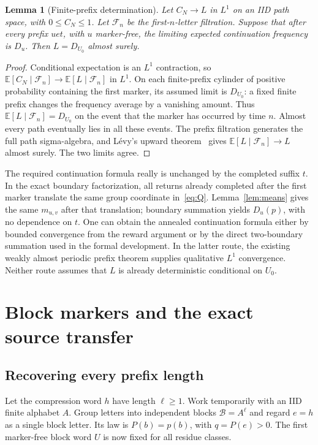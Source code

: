 \documentclass[11pt]{article}
\newtheorem{lemma}[theorem]{Lemma}
\theoremstyle{definition}
\theoremstyle{remark}
\newcommand{\E}{\mathbb E}
\newcommand{\F}{\mathcal F}
\begin{document}
\begin{lemma}[Finite-prefix determination]\label{lem:conditional}
Let $C_N\to L$ in $L^1$ on an IID path space, with $0\leq C_N\leq1$. Let $\F_n$ be the first-$n$-letter filtration. Suppose that after every prefix $u e t$, with $u$ marker-free, the limiting expected continuation frequency is $D_u$. Then $L=D_{U_0}$ almost surely.
\end{lemma}
\begin{proof}
Conditional expectation is an $L^1$ contraction, so
$\E[C_N\mid\F_n]\to\E[L\mid\F_n]$ in $L^1$. On each finite-prefix cylinder of positive probability containing the first marker, its assumed limit is $D_{U_0}$: a fixed finite prefix changes the frequency average by a vanishing amount. Thus $\E[L\mid\F_n]=D_{U_0}$ on the event that the marker has occurred by time $n$. Almost every path eventually lies in all these events. The prefix filtration generates the full path sigma-algebra, and L\'evy's upward theorem~\cite[Theorem 4.6.8]{Durrett2019} gives $\E[L\mid\F_n]\to L$ almost surely. The two limits agree.
\end{proof}

The required continuation formula really is unchanged by the completed suffix $t$. In the exact boundary factorization, all returns already completed after the first marker translate the same group coordinate in~\eqref{eq:Q}. Lemma~\ref{lem:means} gives the same $m_{u,v}$ after that translation; boundary summation yields $D_u(p)$, with no dependence on $t$. One can obtain the annealed continuation formula either by bounded convergence from the reward argument or by the direct two-boundary summation used in the formal development. In the latter route, the existing weakly almost periodic prefix theorem supplies qualitative $L^1$ convergence. Neither route assumes that $L$ is already deterministic conditional on $U_0$.

\section{Block markers and the exact source transfer}\label{sec:blocks}
\subsection{Recovering every prefix length}
Let the compression word $h$ have length $\ell\geq1$. Work temporarily with an IID finite alphabet $A$. Group letters into independent blocks $\mathcal B=A^\ell$ and regard $e=h$ as a single block letter. Its law is $P(b)=p(b)$, with $q=P(e)>0$. The first marker-free block word $U$ is now fixed for all residue classes.
\end{document}
